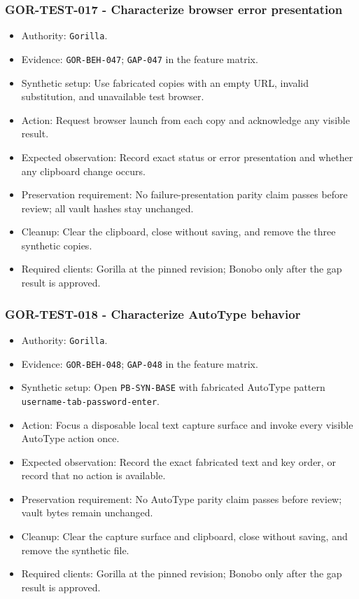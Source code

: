 \documentclass[
  letterpaper,
]{article}
\newcommand{\passthrough}[1]{#1}
\providecommand{\tightlist}{%
  \setlength{\itemsep}{0pt}\setlength{\parskip}{0pt}}
\begin{document}
\subsubsection{GOR-TEST-017 - Characterize browser error
presentation}\label{gor-test-017---characterize-browser-error-presentation}

\begin{itemize}
\tightlist
\item
  Authority: \passthrough{\lstinline!Gorilla!}.
\item
  Evidence: \nolinkurl{GOR-BEH-047}; \passthrough{\lstinline!GAP-047!} in the feature matrix.
\item
  Synthetic setup: Use fabricated copies with an empty URL, invalid substitution, and unavailable test browser.
\item
  Action: Request browser launch from each copy and acknowledge any visible result.
\item
  Expected observation: Record exact status or error presentation and whether any clipboard change occurs.
\item
  Preservation requirement: No failure-presentation parity claim passes before review; all vault hashes stay unchanged.
\item
  Cleanup: Clear the clipboard, close without saving, and remove the three synthetic copies.
\item
  Required clients: Gorilla at the pinned revision; Bonobo only after the gap result is approved.
\end{itemize}

\subsubsection{GOR-TEST-018 - Characterize AutoType behavior}\label{gor-test-018---characterize-autotype-behavior}

\begin{itemize}
\tightlist
\item
  Authority: \passthrough{\lstinline!Gorilla!}.
\item
  Evidence: \nolinkurl{GOR-BEH-048}; \passthrough{\lstinline!GAP-048!} in the feature matrix.
\item
  Synthetic setup: Open \nolinkurl{PB-SYN-BASE} with fabricated AutoType pattern
  \nolinkurl{username-tab-password-enter}.
\item
  Action: Focus a disposable local text capture surface and invoke every visible AutoType action once.
\item
  Expected observation: Record the exact fabricated text and key order, or record that no action is available.
\item
  Preservation requirement: No AutoType parity claim passes before review; vault bytes remain unchanged.
\item
  Cleanup: Clear the capture surface and clipboard, close without saving, and remove the synthetic file.
\item
  Required clients: Gorilla at the pinned revision; Bonobo only after the gap result is approved.
\end{itemize}
\end{document}
